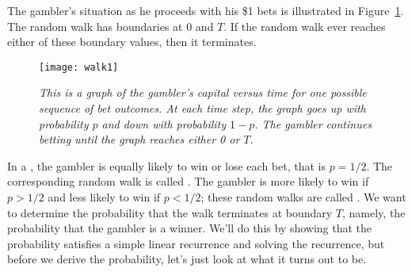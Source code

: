 The gambler's situation as he proceeds with his \$1 bets is illustrated in
Figure~\ref{LN12:fig:walk1}.  The random walk has boundaries at 0 and $T$.  If
the random walk ever reaches either of these boundary values, then it
terminates.

\begin{figure}
  \centerline{\texttt{[image: walk1]}}
  \caption{\em This is a graph of the gambler's capital versus time
  for one possible sequence of bet outcomes.  At each time step, the
  graph goes up with probability $p$ and down with probability $1-p$.
  The gambler continues betting until the graph reaches either 0 or $T$.}
  \label{LN12:fig:walk1}
\end{figure}

In a , the gambler is equally likely to win or lose
each bet, that is $p = 1/2$.  The corresponding random walk is called
.  The gambler is more likely to win if $p>1/2$ and
less likely to win if $p<1/2$; these random walks are called
.  We want to determine the probability that the walk
terminates at boundary $T$, namely, the probability that the gambler
is a winner.  We'll do this by showing that the probability satisfies
a simple linear recurrence and solving the recurrence, but before we
derive the probability, let's just look at what it turns out to be.

